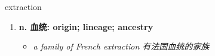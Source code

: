 
\begin{frame}
{\huge extraction}
\begin{center}
\begin{enumerate}\Large
  \item \textbf{n. 血统: origin; lineage; ancestry}
  \begin{itemize}
    \item \em{\Large{a family of French extraction 有法国血统的家族}}
  \end{itemize}
\end{enumerate}
\end{center}
\end{frame}
